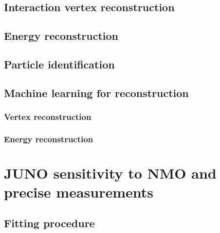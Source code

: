 \subsection{Interaction vertex reconstruction}

\subsection{Energy reconstruction}

\subsection{Particle identification}

\subsection{Machine learning for reconstruction}

\subsubsection{Vertex reconstruction}

\subsubsection{Energy reconstruction}

\section{JUNO sensitivity to NMO and precise measurements}

\subsection{Fitting procedure}
\label{sec:Fit}
